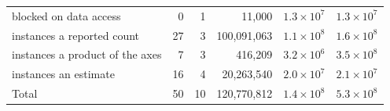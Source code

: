 \begin{table}[H]
\begin{tabular}{@{}l r r r r r@{}}
blocked on data access & 0 & 1 & 11,000 & $1.3\times 10^{7}$ & $1.3\times 10^{7}$ \\
instances a reported count & 27 & 3 & 100,091,063 & $1.1\times 10^{8}$ & $1.6\times 10^{8}$ \\
instances a product of the axes & 7 & 3 & 416,209 & $3.2\times 10^{6}$ & $3.5\times 10^{8}$ \\
instances an estimate & 16 & 4 & 20,263,540 & $2.0\times 10^{7}$ & $2.1\times 10^{7}$ \\
\midrule
Total & 50 & 10 & 120,770,812 & $1.4\times 10^{8}$ & $5.3\times 10^{8}$ \\
\bottomrule
\end{tabular}
\end{table}
